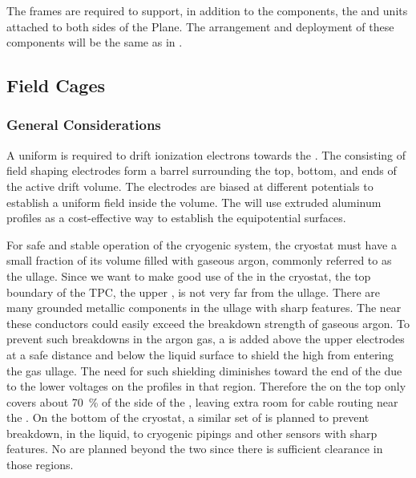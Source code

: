 The  frames are required to support, in addition to the  components, the  and  units attached to both sides of the  Plane. The arrangement and deployment of these components will be the same as in .  

\subsection{Field Cages}

\subsubsection{General Considerations}

A uniform \efield{} is required to drift ionization electrons towards the . The  consisting of field shaping electrodes form a barrel surrounding the top, bottom, and ends of the active drift volume. The electrodes are biased at different potentials to establish a uniform field inside the  volume.
The  will use extruded aluminum profiles as a cost-effective way to establish the equipotential surfaces. 

For safe and stable operation of the \lar cryogenic system, the cryostat must have a small fraction of its volume filled with gaseous argon, commonly referred to as the ullage. Since we want to make good use of the \lar in the cryostat, the top boundary of the TPC, the upper , is not very far from the ullage. There are many grounded metallic components in the ullage with sharp features.  The \efield near these conductors could easily exceed the breakdown strength of gaseous argon. To prevent such breakdowns in the argon gas, a  is added above the upper  electrodes at a safe distance and below the liquid surface to shield the high \efield from entering the gas ullage.  The need for such shielding diminishes toward the  end of the  due to the lower voltages on the  profiles in that region. Therefore the  on the top only covers about \SI{70}{\%} of the  side of the , leaving extra room for cable routing near the .
On the bottom of the cryostat, a similar set of  is planned to prevent breakdown, in the liquid, to cryogenic pipings and other sensors with sharp features.  No  are planned beyond the two  since there is sufficient clearance in those regions.  

